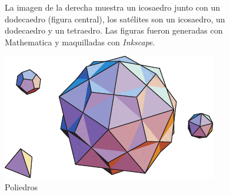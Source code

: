 \documentclass{article}
\begin{document}
	\begin{figure}[!h]
		\begin{minipage}[b]{0.3\textwidth}
			La imagen de la derecha muestra un icosaedro junto con un
			dodecaedro (figura central), los satélites son un icosaedro,
			un dodecaedro y un tetraedro. Las figuras fueron generadas con
			{\sc Mathematica} y maquilladas con {\it Inkscape}.
		\end{minipage} \hfill \begin{minipage}[b]{0.6\textwidth}
		\begin{center}%
			\includegraphics{images/ML_fig3.pdf}
			\caption{ Poliedros}
		\end{center}
	\end{minipage}
\end{figure}
\end{document}
